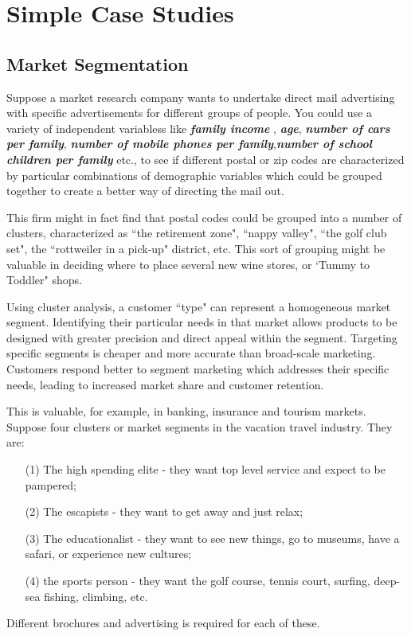 \documentclass[a4paper,12pt]{article}
\begin{document}



\section{Simple Case Studies}
\subsection{Market Segmentation}
Suppose a market research company wants to undertake direct mail advertising with specific advertisements
for different groups of people. You could use a variety of independent variabless like \textbf{\textit{family income}}
, \textbf{\textit{age}}, \textbf{\textit{number of cars per family}}, \textbf{\textit{number of mobile phones per family}},\textbf{\textit{number of school children per family}}  etc., to see if different postal or zip codes are characterized by particular combinations of demographic variables which could be grouped together to create a better way of directing the mail out.

This firm might in fact find that postal codes could be grouped into a number of clusters, characterized as ``the retirement zone", ``nappy valley", ``the golf club set", the ``rottweiler in a pick-up" district, etc. This sort of grouping might  be valuable in deciding where to place several new wine stores, or `Tummy to Toddler" shops.

Using cluster analysis, a customer ``type" can represent a homogeneous market segment.
Identifying their particular needs in that market allows products to be designed with greater
precision and direct appeal within the segment. Targeting specific segments is cheaper and
more accurate than broad-scale marketing. Customers respond better to segment marketing
which addresses their specific needs, leading to increased market share and customer
retention.

This is valuable, for example, in banking, insurance and tourism markets. Suppose
four clusters or market segments in the vacation travel industry. They are:
\begin{itemize}
\item[(1)] The high spending elite - they want top level service and expect to be pampered;
\item[(2)] The escapists - they want to get away and just relax;
\item[(3)] The educationalist - they want to see new things, go to museums,
have a safari, or experience new cultures;
\item[(4)] the sports person - they want the golf course, tennis court, surfing, deep-sea fishing, climbing, etc.
\end{itemize}
Different brochures and advertising is required for each of these.
\end{document}
